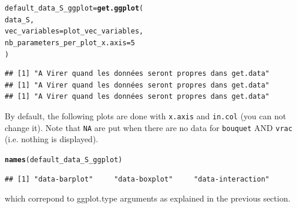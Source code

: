 \documentclass{article}\usepackage[]{graphicx}\usepackage[]{color}
\makeatletter
\newcommand{\hlnum}[1]{\textcolor[rgb]{0.686,0.059,0.569}{#1}}%
\newcommand{\hlstd}[1]{\textcolor[rgb]{0.345,0.345,0.345}{#1}}%
\newcommand{\hlkwb}[1]{\textcolor[rgb]{0.69,0.353,0.396}{#1}}%
\newcommand{\hlkwc}[1]{\textcolor[rgb]{0.333,0.667,0.333}{#1}}%
\newcommand{\hlkwd}[1]{\textcolor[rgb]{0.737,0.353,0.396}{\textbf{#1}}}%
\newenvironment{kframe}{%
 \def\at@end@of@kframe{}%
 \ifinner\ifhmode%
  \def\at@end@of@kframe{\end{minipage}}%
  \begin{minipage}{\columnwidth}%
 \fi\fi%
 \def\FrameCommand##1{\hskip\@totalleftmargin \hskip-\fboxsep
 \colorbox{shadecolor}{##1}\hskip-\fboxsep
     \hskip-\linewidth \hskip-\@totalleftmargin \hskip\columnwidth}%
 \MakeFramed {\advance\hsize-\width
   \@totalleftmargin\z@ \linewidth\hsize
   \@setminipage}}%
 {\par\unskip\endMakeFramed%
 \at@end@of@kframe}
\newenvironment{knitrout}{}{} %
\makeatother
\begin{document}
\begin{knitrout}
\color{fgcolor}\begin{kframe}
\begin{alltt}
\hlstd{default_data_S_ggplot} \hlkwb{=} \hlkwd{get.ggplot}\hlstd{(}
        \hlstd{data_S,}
        \hlkwc{vec_variables} \hlstd{= plot_vec_variables,}
        \hlkwc{nb_parameters_per_plot_x.axis} \hlstd{=} \hlnum{5}
        \hlstd{)}
\end{alltt}


{\ttfamily\noindent\itshape{}}\begin{verbatim}
## [1] "A Virer quand les données seront propres dans get.data"
## [1] "A Virer quand les données seront propres dans get.data"
## [1] "A Virer quand les données seront propres dans get.data"
\end{verbatim}
\end{kframe}
\end{knitrout}

By default, the following plots are done with \texttt{x.axis} and \texttt{in.col} (you can not change it).
Note that \texttt{NA} are put when there are no data for \texttt{bouquet} AND \texttt{vrac} (i.e. nothing is displayed).

\begin{knitrout}
\color{fgcolor}\begin{kframe}
\begin{alltt}
\hlkwd{names}\hlstd{(default_data_S_ggplot)}
\end{alltt}
\begin{verbatim}
## [1] "data-barplot"     "data-boxplot"     "data-interaction"
\end{verbatim}
\end{kframe}
\end{knitrout}

which correpond to ggplot.type arguments as explained in the previous section.
\end{document}
